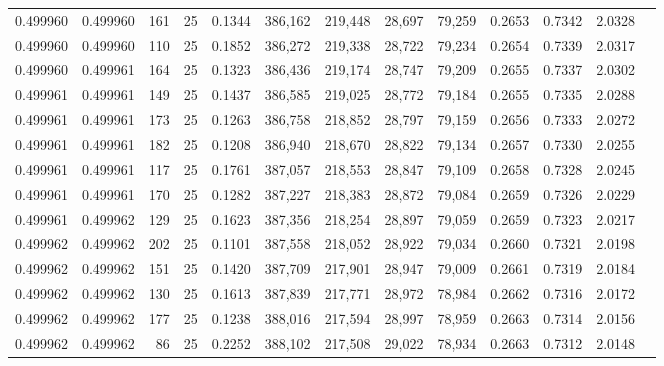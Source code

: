 \begin{tabular}{rrrrrrrrrrrrr}
0.499960 & 0.499960 &   161 &  25 &                                     0.1344 & 386,162 & 219,448 &  28,697 &  79,259 & 0.2653 & 0.7342 & 2.0328 \\
0.499960 & 0.499960 &   110 &  25 &                                     0.1852 & 386,272 & 219,338 &  28,722 &  79,234 & 0.2654 & 0.7339 & 2.0317 \\
0.499960 & 0.499961 &   164 &  25 &                                     0.1323 & 386,436 & 219,174 &  28,747 &  79,209 & 0.2655 & 0.7337 & 2.0302 \\
0.499961 & 0.499961 &   149 &  25 &                                     0.1437 & 386,585 & 219,025 &  28,772 &  79,184 & 0.2655 & 0.7335 & 2.0288 \\
0.499961 & 0.499961 &   173 &  25 &                                     0.1263 & 386,758 & 218,852 &  28,797 &  79,159 & 0.2656 & 0.7333 & 2.0272 \\
0.499961 & 0.499961 &   182 &  25 &                                     0.1208 & 386,940 & 218,670 &  28,822 &  79,134 & 0.2657 & 0.7330 & 2.0255 \\
0.499961 & 0.499961 &   117 &  25 &                                     0.1761 & 387,057 & 218,553 &  28,847 &  79,109 & 0.2658 & 0.7328 & 2.0245 \\
0.499961 & 0.499961 &   170 &  25 &                                     0.1282 & 387,227 & 218,383 &  28,872 &  79,084 & 0.2659 & 0.7326 & 2.0229 \\
0.499961 & 0.499962 &   129 &  25 &                                     0.1623 & 387,356 & 218,254 &  28,897 &  79,059 & 0.2659 & 0.7323 & 2.0217 \\
0.499962 & 0.499962 &   202 &  25 &                                     0.1101 & 387,558 & 218,052 &  28,922 &  79,034 & 0.2660 & 0.7321 & 2.0198 \\
0.499962 & 0.499962 &   151 &  25 &                                     0.1420 & 387,709 & 217,901 &  28,947 &  79,009 & 0.2661 & 0.7319 & 2.0184 \\
0.499962 & 0.499962 &   130 &  25 &                                     0.1613 & 387,839 & 217,771 &  28,972 &  78,984 & 0.2662 & 0.7316 & 2.0172 \\
0.499962 & 0.499962 &   177 &  25 &                                     0.1238 & 388,016 & 217,594 &  28,997 &  78,959 & 0.2663 & 0.7314 & 2.0156 \\
0.499962 & 0.499962 &    86 &  25 &                                     0.2252 & 388,102 & 217,508 &  29,022 &  78,934 & 0.2663 & 0.7312 & 2.0148 \\

\end{tabular}
